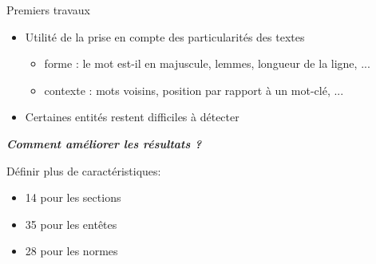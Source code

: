 \documentclass[newPxFont,pagenumber]{beamer}
\begin{document}
\begin{frame}{Premiers travaux \cite{tagny2017sectNerhmmcrf}}
\begin{itemize}
\item Utilité de la prise en compte des particularités des textes
\begin{itemize}
\item forme : le mot est-il en majuscule, lemmes, longueur de la ligne, ...
\item contexte : mots voisins, position par rapport à un mot-clé, ...
\end{itemize}
\item Certaines entités restent difficiles à détecter
\end{itemize}

\vspace{1.5cm}

\textbf{\Large \textit{Comment améliorer les résultats ?}}

Définir plus de caractéristiques:

\begin{itemize}
\item 14 pour les sections
\item 35 pour les entêtes
\item 28 pour les normes
\end{itemize}
\end{frame}
\end{document}

